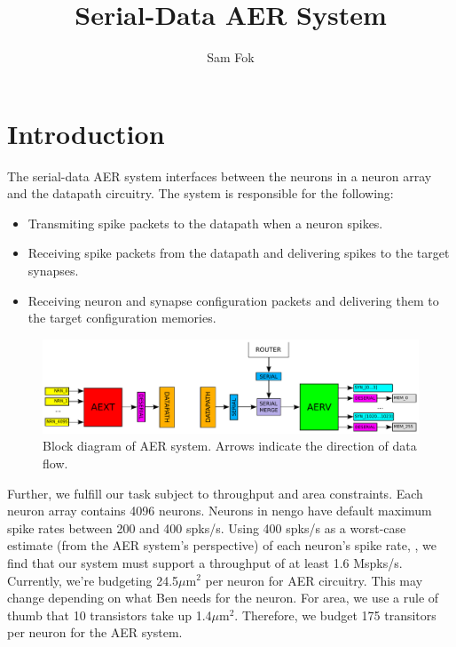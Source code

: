 \documentclass{article}
\begin{document}
\title{Serial-Data AER System}
\author{Sam Fok}
\maketitle

\tableofcontents

\section{Introduction \label{sec:intro}}

The serial-data AER system interfaces between the neurons in a neuron array
and the datapath circuitry. The system is responsible for the following:
\begin{itemize}
    \item Transmiting spike packets to the datapath when a neuron spikes.
    \item Receiving spike packets from the datapath and delivering spikes
          to the target synapses.
    \item Receiving neuron and synapse configuration packets and delivering
          them to the target configuration memories.
\end{itemize}

\begin{figure}
    \centering
    \includegraphics[width=.95\textwidth]{img/aer_system.pdf}
    \caption{Block diagram of AER system.
    Arrows indicate the direction of data flow.}
    \label{fig:aer_system}
\end{figure}

Further, we fulfill our task subject to throughput and area constraints. Each
neuron array contains 4096 neurons. Neurons in nengo have default maximum spike
rates between 200 and 400 spks/s. Using 400 spks/s as a worst-case
estimate (from the AER system's perspective) of each neuron's spike rate,
, we find that our system must support a throughput of at least 1.6 Mspks/s.
Currently, we're budgeting 24.5$\mu$m$^2$ per neuron for AER circuitry. This
may change depending on what Ben needs for the neuron. For area, we use a rule
of thumb that 10 transistors take up 1.4$\mu$m$^2$. Therefore, we budget
175 transitors per neuron for the AER system.
\end{document}
